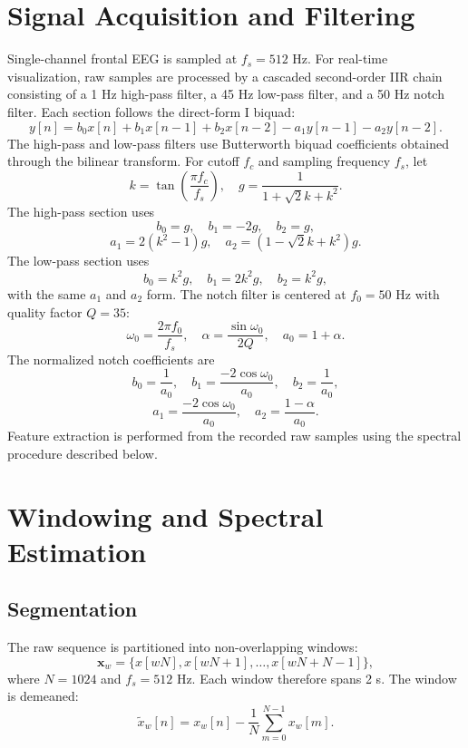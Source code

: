 \documentclass[conference]{IEEEtran}
\begin{document}
\section{Signal Acquisition and Filtering}
Single-channel frontal EEG is sampled at $f_s=512$ Hz. For real-time visualization, raw samples are processed by a cascaded second-order IIR chain consisting of a 1 Hz high-pass filter, a 45 Hz low-pass filter, and a 50 Hz notch filter. Each section follows the direct-form I biquad:
\begin{equation}
y[n]=b_0x[n]+b_1x[n-1]+b_2x[n-2]-a_1y[n-1]-a_2y[n-2].
\end{equation}
The high-pass and low-pass filters use Butterworth biquad coefficients obtained through the bilinear transform. For cutoff $f_c$ and sampling frequency $f_s$, let
\begin{equation}
k=\tan\left(\frac{\pi f_c}{f_s}\right),\quad
g=\frac{1}{1+\sqrt{2}k+k^2}.
\end{equation}
The high-pass section uses
\begin{equation}
b_0=g,\quad b_1=-2g,\quad b_2=g,
\end{equation}
\begin{equation}
a_1=2(k^2-1)g,\quad a_2=(1-\sqrt{2}k+k^2)g.
\end{equation}
The low-pass section uses
\begin{equation}
b_0=k^2g,\quad b_1=2k^2g,\quad b_2=k^2g,
\end{equation}
with the same $a_1$ and $a_2$ form. The notch filter is centered at $f_0=50$ Hz with quality factor $Q=35$:
\begin{equation}
\omega_0=\frac{2\pi f_0}{f_s},\quad
\alpha=\frac{\sin \omega_0}{2Q},\quad a_0=1+\alpha .
\end{equation}
The normalized notch coefficients are
\begin{equation}
b_0=\frac{1}{a_0},\quad b_1=\frac{-2\cos \omega_0}{a_0},\quad b_2=\frac{1}{a_0},
\end{equation}
\begin{equation}
a_1=\frac{-2\cos \omega_0}{a_0},\quad a_2=\frac{1-\alpha}{a_0}.
\end{equation}
Feature extraction is performed from the recorded raw samples using the spectral procedure described below.

\section{Windowing and Spectral Estimation}
\subsection{Segmentation}
The raw sequence is partitioned into non-overlapping windows:
\begin{equation}
\mathbf{x}_w=\{x[wN],x[wN+1],\ldots,x[wN+N-1]\},
\end{equation}
where $N=1024$ and $f_s=512$ Hz. Each window therefore spans 2 s. The window is demeaned:
\begin{equation}
\tilde{x}_w[n]=x_w[n]-\frac{1}{N}\sum_{m=0}^{N-1}x_w[m].
\end{equation}
\end{document}
